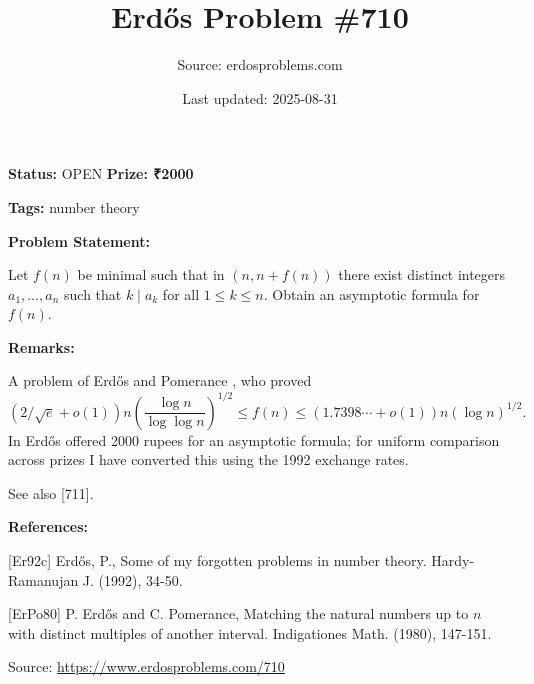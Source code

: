 \documentclass{article}
\title{Erd\H{o}s Problem \#710}
\date{Last updated: 2025-08-31}
\author{Source: erdosproblems.com}
\begin{document}
\maketitle

\noindent\textbf{Status:} OPEN \quad \textbf{Prize: ₹2000}

\noindent\textbf{Tags:} number theory

\medskip
\noindent\textbf{Problem Statement:}

Let $f(n)$ be minimal such that in $(n,n+f(n))$ there exist distinct integers $a_1,\ldots,a_n$ such that $k\mid a_k$ for all $1\leq k\leq n$. Obtain an asymptotic formula for $f(n)$.

\bigskip
\noindent\textbf{Remarks:}

A problem of Erd\H{o}s and Pomerance \cite{ErPo80}, who proved\[(2/\sqrt{e}+o(1))n\left(\frac{\log n}{\log\log n}\right)^{1/2}\leq f(n)\leq (1.7398\cdots+o(1))n(\log n)^{1/2}.\]In \cite{Er92c} Erd\H{o}s offered 2000 rupees for an asymptotic formula; for uniform comparison across prizes I have converted this using the 1992 exchange rates.

See also [711].

\bigskip
\noindent\textbf{References:}

[Er92c] Erd\H{o}s, P., Some of my forgotten problems in number theory. Hardy-Ramanujan J. (1992), 34-50.
 
 [ErPo80] P. Erd\H{o}s and C. Pomerance, Matching the natural numbers up to $n$ with distinct multiples of another interval. Indigationes Math. (1980), 147-151.

\bigskip
\noindent\small{Source: \url{https://www.erdosproblems.com/710}}
\end{document}
